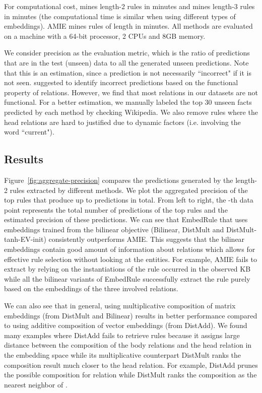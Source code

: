 \documentclass{article} \usepackage{iclr2015,times}
\begin{document}
For computational cost,  mines length-2 rules in  minutes and mines length-3 rules in  minutes (the computational time is similar when using different types of embeddings). {\sc AMIE} mines rules of length  in  minutes. All methods are evaluated on a machine with a 64-bit processor, 2 CPUs and 8GB memory.

We consider precision as the evaluation metric, which is the ratio of predictions that are in the test (unseen) data to all the generated unseen predictions. Note that this is an estimation, since a prediction is not necessarily ``incorrect" if it is not seen. \citet{galarraga2013amie} suggested to identify incorrect predictions based on the functional property of relations. However, we find that most relations in our datasets are not functional. For a better estimation, we manually labeled the top 30 unseen facts predicted by each method by checking Wikipedia. We also remove rules where the head relations are hard to justified due to dynamic factors (i.e. involving the word ``current").
\subsection{Results}
Figure~\ref{fig:aggregate-precision} compares the predictions generated by the length-2 rules extracted by different methods. We plot the aggregated precision of the top rules that produce up to  predictions in total. From left to right, the -th data point represents the total number of predictions of the top  rules and the estimated precision of these predictions. We can see that {\sc EmbedRule} that uses embeddings trained from the bilinear objective ({\sc Bilinear}, {\sc DistMult} and {\sc DistMult-tanh-EV-init}) consistently outperforms {\sc AMIE}. This suggests that the bilinear embeddings contain good amount of information about relations which allows for effective rule selection without looking at the entities. For example, {\sc AMIE} fails to extract  by relying on the instantiations of the rule occurred in the observed KB while all the bilinear variants of {\sc EmbedRule} successfully extract the rule purely based on the embeddings of the three involved relations. 

We can also see that in general, using multiplicative composition of matrix embeddings (from {\sc DistMult} and {\sc Bilinear}) results in better performance compared to using additive composition of vector embeddings (from {\sc DistAdd}). We found many examples where {\sc DistAdd} fails to retrieve rules because it assigns large distance between the composition of the body relations and the head relation in the embedding space while its multiplicative counterpart {\sc DistMult} ranks the composition result much closer to the head relation. For example, {\sc DistAdd} prunes the possible composition  for relation  while {\sc DistMult} ranks the composition as the nearest neighbor of . 
\end{document}
